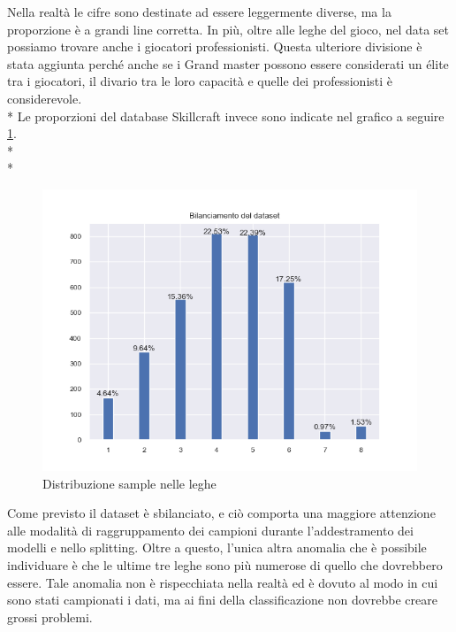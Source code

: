 Nella realtà le cifre sono destinate ad essere leggermente diverse, ma la proporzione è a grandi line corretta. In più, oltre alle leghe del gioco, nel data set possiamo trovare anche i giocatori professionisti. Questa ulteriore divisione è stata aggiunta perché anche se i Grand master possono essere considerati un élite tra i giocatori, il divario tra le loro capacità e quelle dei professionisti è considerevole.\\*
Le proporzioni del database Skillcraft invece sono indicate nel grafico a seguire \ref{fig:dist}. \\*\\*
\begin{figure}[h]
	\includegraphics[scale=0.9]{../figures/sbilanciamento.PNG}
	\caption{Distribuzione sample nelle leghe}
	\label{fig:dist}
\end{figure}
\par
Come previsto il dataset è sbilanciato, e ciò comporta una maggiore attenzione alle modalità di raggruppamento dei campioni durante l'addestramento dei modelli e nello splitting. Oltre a questo, l'unica altra anomalia che è possibile individuare è che le ultime tre leghe sono più numerose di quello che dovrebbero essere. Tale anomalia non è rispecchiata nella realtà ed è dovuto al modo in cui sono stati campionati i dati, ma ai fini della classificazione non dovrebbe creare grossi problemi.
\clearpage
